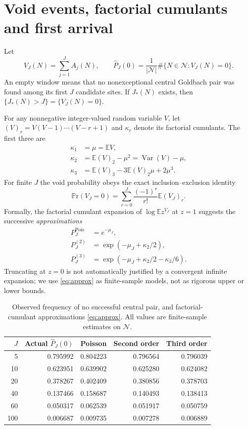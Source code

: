 \documentclass[11pt,a4paper]{article}
\theoremstyle{definition}
\newcommand{\E}{\mathbb E}
\newcommand{\Prob}{\mathbb P\mathrm r}
\begin{document}
\section{Void events, factorial cumulants and first arrival}
Let
\begin{equation}\label{eq:VJ}
 V_J(N)=\sum_{j=1}^J A_j(N),\qquad
 \widehat P_J(0)=\frac1{|\mathcal N|}\#\{N\in\mathcal N:V_J(N)=0\}.
\end{equation}
An empty window means that no nonexceptional central Goldbach pair was found among its first $J$ candidate sites. If $J_*(N)$ exists, then $\{J_*(N)>J\}=\{V_J(N)=0\}$.

For any nonnegative integer-valued random variable $V$, let $(V)_r=V(V-1)\cdots(V-r+1)$ and $\kappa_r$ denote its factorial cumulants.  The first three are
\begin{align}
 \kappa_1&=\mu=\E V,\nonumber\\
 \kappa_2&=\E(V)_2-\mu^2=\operatorname{Var}(V)-\mu,\label{eq:cums}\\
 \kappa_3&=\E(V)_3-3\E(V)_2\mu+2\mu^3.\nonumber
\end{align}
For finite $J$ the void probability obeys the exact inclusion--exclusion identity
\begin{equation}\label{eq:IE}
 \Prob(V_J=0)=\sum_{r=0}^J\frac{(-1)^r}{r!}\E (V_J)_r.
\end{equation}
Formally, the factorial cumulant expansion of $\log\E z^{V_J}$ at $z=1$ suggests the successive \emph{approximations}
\begin{align}
 P_J^{\mathrm{Pois}}&=e^{-\mu_J},\nonumber\\
 P_J^{(2)}&=\exp(-\mu_J+\kappa_2/2),\label{eq:approx}\\
 P_J^{(3)}&=\exp(-\mu_J+\kappa_2/2-\kappa_3/6).\nonumber
\end{align}
Truncating at $z=0$ is not automatically justified by a convergent infinite expansion; we use \eqref{eq:approx} as finite-sample models, not as rigorous upper or lower bounds.

\begin{table}[ht]
\centering\small
\begin{tabular}{@{}rrrrr@{}}
\toprule
$J$ & Actual $\widehat P_J(0)$ & Poisson & Second order & Third order\\
\midrule
5 & 0.795992 & 0.804223 & 0.796564 & 0.796039\\
10 & 0.623951 & 0.639902 & 0.625280 & 0.624082\\
20 & 0.378267 & 0.402409 & 0.380856 & 0.378703\\
40 & 0.137466 & 0.158687 & 0.140493 & 0.138413\\
60 & 0.050317 & 0.062539 & 0.051917 & 0.050759\\
100 & 0.006687 & 0.009735 & 0.007278 & 0.006889\\
\bottomrule
\end{tabular}
\caption{Observed frequency of no successful central pair, and factorial-cumulant approximations \eqref{eq:approx}. All values are finite-sample estimates on $\mathcal N$.}
\label{tab:void}
\end{table}
\end{document}
